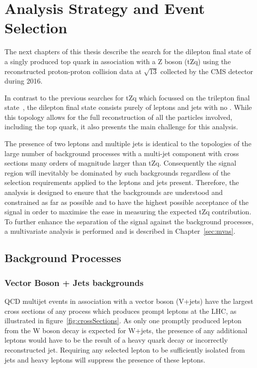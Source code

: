 \chapter{Analysis Strategy and Event Selection}\label{chapter:tzq-search}
The next chapters of this thesis describe the search for the dilepton final state of a singly produced top quark in association with a Z boson (tZq) using the reconstructed proton-proton collision data at $\sqrt{13}$ collected by the CMS detector during 2016.

In contrast to the previous searches for tZq which focussed on the trilepton final state~\cite{Sirunyan:2017kkr,Sirunyan:2017nbr}, the dilepton final state consists purely of leptons and jets with no \MET.
While this topology allows for the full reconstruction of all the particles involved, including the top quark, it also presents the main challenge for this analysis.

The presence of two leptons and multiple jets is identical to the topologies of the large number of background processes with a multi-jet component with cross sections many orders of magnitude larger than tZq.
Consequently the signal region will inevitably be dominated by such backgrounds regardless of the selection requirements applied to the leptons and jets present.
Therefore, the analysis is designed to ensure that the backgrounds are understood and constrained as far as possible and to have the highest possible acceptance of the signal in order to maximise the ease in measuring the expected tZq contribution.
To further enhance the separation of the signal against the background processes, a multivariate analysis is performed and is described in Chapter~\ref{sec:mvas}.

\section{Background Processes}\label{sec:backgroundProcesses}
\subsection{Vector Boson + Jets backgrounds}
QCD multijet events in association with a vector boson (V+jets) have the largest cross sections of any process which produces prompt leptons at the LHC, as illustrated in figure~\ref{fig:crossSections}.
As only one promptly produced lepton from the W boson decay is expected for W+jets, the presence of any additional leptons would have to be the result of a heavy quark decay or incorrectly reconstructed jet. 
Requiring any selected lepton to be sufficiently isolated from jets and heavy leptons will suppress the presence of these leptons.

